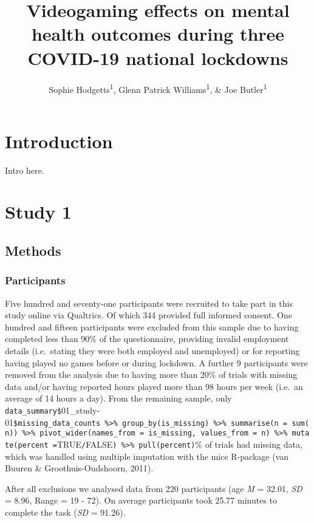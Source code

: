 \documentclass[
  english,
  man,floatsintext]{apa6}
\title{Videogaming effects on mental health outcomes during three COVID-19 national lockdowns}
\author{Sophie Hodgetts\textsuperscript{1}, Glenn Patrick Williams\textsuperscript{1}, \& Joe Butler\textsuperscript{1}}
\date{}
\affiliation{\vspace{0.5cm}\textsuperscript{1} University of Sunderland}
\begin{document}
\maketitle

\hypertarget{introduction}{%
\section{Introduction}\label{introduction}}

Intro here.

\hypertarget{study-1}{%
\section{Study 1}\label{study-1}}

\hypertarget{methods}{%
\subsection{Methods}\label{methods}}

\hypertarget{participants}{%
\subsubsection{Participants}\label{participants}}

Five hundred and seventy-one participants were recruited to take part in this study online via Qualtrics. Of which 344 provided full informed consent. One hundred and fifteen participants were excluded from this sample due to having completed less than 90\% of the questionnaire, providing invalid employment details (i.e.~stating they were both employed and unemployed) or for reporting having played no games before or during lockdown. A further 9 participants were removed from the analysis due to having more than 20\% of trials with missing data and/or having reported hours played more than 98 hours per week (i.e.~an average of 14 hours a day). From the remaining sample, only \texttt{data\_summary\$}01\_study-01\texttt{\$missing\_data\_counts\ \%\textgreater{}\%\ group\_by(is\_missing)\ \%\textgreater{}\%\ summarise(n\ =\ sum(n))\ \%\textgreater{}\%\ pivot\_wider(names\_from\ =\ is\_missing,\ values\_from\ =\ n)\ \%\textgreater{}\%\ mutate(percent\ =}TRUE\texttt{/}FALSE\texttt{)\ \%\textgreater{}\%\ pull(percent)}\% of trials had missing data, which was handled using multiple imputation with the mice R-package (van Buuren \& Groothuis-Oudshoorn, 2011).

After all exclusions we analysed data from 220 participants (age \emph{M} = 32.01, \emph{SD} = 8.96, Range = 19 - 72). On average participants took 25.77 minutes to complete the task (\emph{SD} = 91.26).
\end{document}
